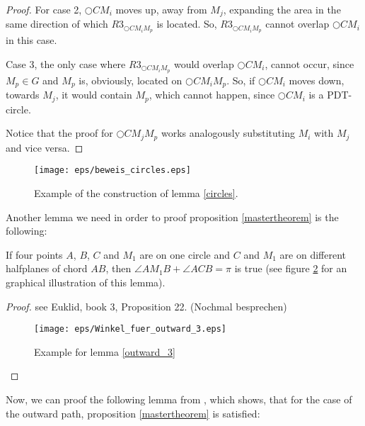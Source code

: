 \begin{proof}
For case 2, $\bigcirc{CM_i} $ moves up, away from $M_j $, expanding the area in the same direction of which $R3_{\bigcirc{CM_iM_p}} $ is located.
So, $R3_{\bigcirc{CM_iM_p}} $ cannot overlap $\bigcirc{CM_i} $ in this case.

Case 3, the only case where $R3_{\bigcirc{CM_iM_p}} $ would overlap $\bigcirc{CM_i} $, cannot occur, since $M_p \in G $ and $M_p $ is, obviously, located on $\bigcirc{CM_iM_p} $.
So, if $\bigcirc{CM_i} $ moves down, towards $M_j $, it would contain $M_p $, which cannot happen, since $\bigcirc{CM_i} $ is a PDT-circle. 

Notice that the proof for $\bigcirc{CM_jM_p} $ works analogously substituting $M_i $ with $M_j $ and vice versa.
 
\end{proof}
\begin{figure}[h!]
\centering
\texttt{[image: eps/beweis\_circles.eps]}
\caption{Example of the construction of lemma \ref{circles}.}
\label{fig:beweis_circles}
\end{figure}
Another lemma we need in order to proof proposition \ref{mastertheorem} is the following:
\begin{lemma}
\label{outward_3}
If four points $A $, $B $, $C $ and $M_1 $ are on one circle and $C $ and $M_1 $ are on different halfplanes of chord $AB $, then $\angle{AM_1B} + \angle{ACB} =\pi $ is true (see figure \ref{fig:winkel_fuer_outward_3} for an graphical illustration of this lemma).
\end{lemma}
\begin{proof}
see Euklid, book 3, Proposition 22.  (Nochmal besprechen)


\begin{figure}[h!]
\centering
\texttt{[image: eps/Winkel\_fuer\_outward\_3.eps]}
\caption{Example for lemma \ref{outward_3} }
\label{fig:winkel_fuer_outward_3}
\end{figure}
\end{proof}
Now, we can proof the following lemma from \cite{kanj}, which shows, that for the case of the outward path, proposition \ref{mastertheorem} is satisfied:

